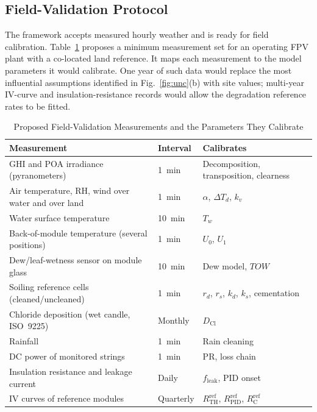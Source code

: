 \documentclass[journal]{IEEEtran}
\newcommand{\TOWsym}{\mathit{TOW}}
\begin{document}
\subsection{Field-Validation Protocol}
The framework accepts measured hourly weather and is ready for field calibration. Table~\ref{tab:val} proposes a minimum
measurement set for an operating FPV plant with a co-located land reference. It maps each measurement to the model
parameters it would calibrate. One year of such data would replace the most influential assumptions identified in
Fig.~\ref{fig:unc}(b) with site values; multi-year IV-curve and insulation-resistance records would allow the
degradation reference rates to be fitted.

\begin{table}[!t]
\caption{Proposed Field-Validation Measurements and the Parameters They Calibrate}
\label{tab:val}
\centering
\scriptsize
\setlength{\tabcolsep}{2pt}
\begin{tabular}{@{}p{30mm}p{18mm}p{33mm}@{}}
\toprule
Measurement & Interval & Calibrates \\
\midrule
GHI and POA irradiance (pyranometers) & 1~min & Decomposition, transposition, clearness \\
Air temperature, RH, wind over water and over land & 1~min & $\alpha$, $\Delta T_d$, $k_v$ \\
Water surface temperature & 10~min & $T_w$ \\
Back-of-module temperature (several positions) & 1~min & $U_0$, $U_1$ \\
Dew/leaf-wetness sensor on module glass & 10~min & Dew model, $\TOWsym$ \\
Soiling reference cells (cleaned/uncleaned) & 1~min & $r_d$, $r_s$, $k_d$, $k_s$, cementation \\
Chloride deposition (wet candle, ISO~9225) & Monthly & $D_{\mathrm{Cl}}$ \\
Rainfall & 1~min & Rain cleaning \\
DC power of monitored strings & 1~min & PR, loss chain \\
Insulation resistance and leakage current & Daily & $f_{\mathrm{leak}}$, PID onset \\
IV curves of reference modules & Quarterly & $R_{\mathrm{TH}}^{\mathrm{ref}}$, $R_{\mathrm{PID}}^{\mathrm{ref}}$, $R_{\mathrm{C}}^{\mathrm{ref}}$ \\
\bottomrule
\end{tabular}
\end{table}
\end{document}
